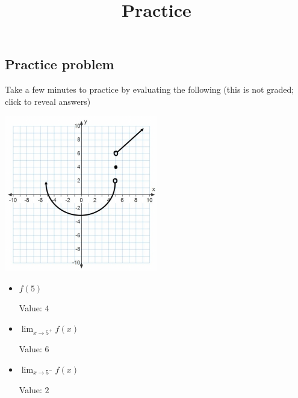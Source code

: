 \documentclass{ximera}
\title{Practice}
\begin{document}
\maketitle

\subsection{Practice problem}

Take a few minutes to practice by evaluating the following (this is not graded; click to reveal answers)

\includegraphics[width=0.5\textwidth]{graph2.png}

\begin{itemize}
    \item $f(5)$
    \begin{expandable}
        Value: $4$
    \end{expandable}
    \item $\lim_{x\to5^+} f(x)$
    \begin{foldable}
        Value: $6$
    \end{foldable}
    \item $\lim_{x\to5^-} f(x)$
    \begin{expandable}
        Value: $2$
    \end{expandable}
\end{itemize}
\end{document}
